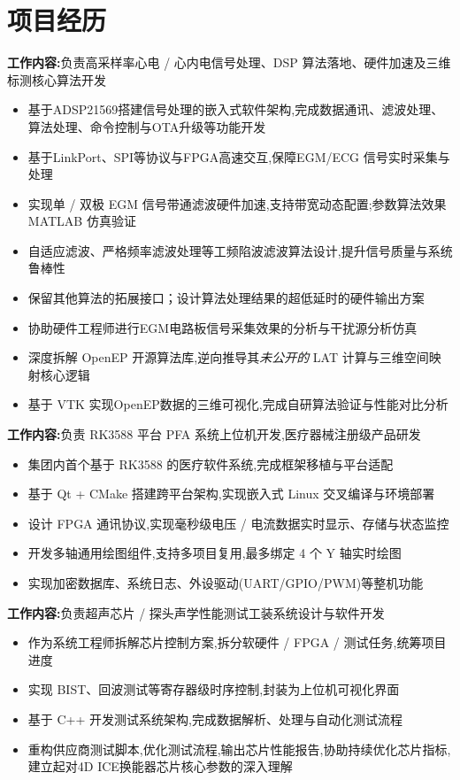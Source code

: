 \documentclass{resume}
\begin{document}
\section{项目经历}
\textbf{工作内容:}负责高采样率心电 / 心内电信号处理、DSP 算法落地、硬件加速及三维标测核心算法开发
\begin{itemize}
    \item 基于ADSP21569搭建信号处理的嵌入式软件架构,完成数据通讯、滤波处理、算法处理、命令控制与OTA升级等功能开发
    \item 基于LinkPort、SPI等协议与FPGA高速交互,保障EGM/ECG 信号实时采集与处理
    \item 实现单 / 双极 EGM 信号带通滤波硬件加速,支持带宽动态配置;参数算法效果MATLAB 仿真验证
    \item 自适应滤波、严格频率滤波处理等工频陷波滤波算法设计,提升信号质量与系统鲁棒性
    \item 保留其他算法的拓展接口；设计算法处理结果的超低延时的硬件输出方案
    \item 协助硬件工程师进行EGM电路板信号采集效果的分析与干扰源分析仿真
    \item 深度拆解 OpenEP 开源算法库,逆向推导其\textit{未公开的} LAT 计算与三维空间映射核心逻辑
    \item 基于 VTK 实现OpenEP数据的三维可视化,完成自研算法验证与性能对比分析
\end{itemize}

\textbf{工作内容:}负责 RK3588 平台 PFA 系统上位机开发,医疗器械注册级产品研发
\begin{itemize}
  \item 集团内首个基于 RK3588 的医疗软件系统,完成框架移植与平台适配
  \item 基于 Qt + CMake 搭建跨平台架构,实现嵌入式 Linux 交叉编译与环境部署
  \item 设计 FPGA 通讯协议,实现毫秒级电压 / 电流数据实时显示、存储与状态监控
  \item 开发多轴通用绘图组件,支持多项目复用,最多绑定 4 个 Y 轴实时绘图
  \item 实现加密数据库、系统日志、外设驱动(UART/GPIO/PWM)等整机功能
\end{itemize}

\textbf{工作内容:}负责超声芯片 / 探头声学性能测试工装系统设计与软件开发
\begin{itemize}
  \item 作为系统工程师拆解芯片控制方案,拆分软硬件 / FPGA / 测试任务,统筹项目进度
  \item 实现 BIST、回波测试等寄存器级时序控制,封装为上位机可视化界面
  \item 基于 C++ 开发测试系统架构,完成数据解析、处理与自动化测试流程
  \item 重构供应商测试脚本,优化测试流程,输出芯片性能报告,协助持续优化芯片指标,建立起对4D ICE换能器芯片核心参数的深入理解
\end{itemize}
\end{document}
